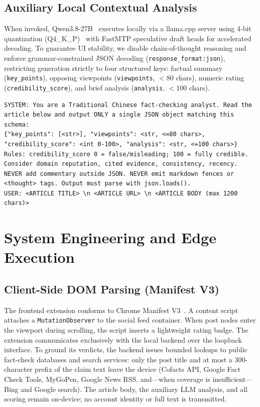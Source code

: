 \documentclass[twoside]{llncs}
\begin{document}
\subsection{Auxiliary Local Contextual Analysis}
When invoked, Qwen3.8-27B~\cite{qwen2025report} executes locally via a llama.cpp server using 4-bit quantization (Q4\_K\_P)~\cite{gguf2023} with FastMTP speculative draft heads for accelerated decoding. To guarantee UI stability, we disable chain-of-thought reasoning and enforce grammar-constrained JSON decoding (\texttt{response\_format:\allowbreak json}), restricting generation strictly to four structured keys: factual summary (\texttt{key\_points}), opposing viewpoints (\texttt{viewpoints}, $<80$ chars), numeric rating (\texttt{credibility\_score}), and brief analysis (\texttt{analysis}, $<100$ chars).

\begin{lstlisting}[basicstyle=\ttfamily\tiny,breaklines=true,
  columns=fullflexible,keepspaces=true,showstringspaces=false,
  frame=single,framesep=2pt,aboveskip=2pt,belowskip=2pt]
SYSTEM: You are a Traditional Chinese fact-checking analyst. Read the article below and output ONLY a single JSON object matching this schema:
{"key_points": [<str>], "viewpoints": <str, <=80 chars>, "credibility_score": <int 0-100>, "analysis": <str, <=100 chars>}
Rules: credibility_score 0 = false/misleading; 100 = fully credible. Consider domain reputation, cited evidence, consistency, recency. NEVER add commentary outside JSON. NEVER emit markdown fences or <thought> tags. Output must parse with json.loads().
USER: <ARTICLE TITLE> \n <ARTICLE URL> \n <ARTICLE BODY (max 1200 chars)>
\end{lstlisting}

\section{System Engineering and Edge Execution}

\subsection{Client-Side DOM Parsing (Manifest V3)}
The frontend extension conforms to Chrome Manifest V3~\cite{chrome_mv3}. A content script attaches a \texttt{MutationObserver} to the social feed container. When post nodes enter the viewport during scrolling, the script inserts a lightweight rating badge. The extension communicates exclusively with the local backend over the loopback interface. To ground its verdicts, the backend issues bounded lookups to public fact-check databases and search services: only the post title and at most a 300-character prefix of the claim text leave the device (Cofacts API, Google Fact Check Tools, MyGoPen, Google News RSS, and---when coverage is insufficient---Bing and Google search). The article body, the auxiliary LLM analysis, and all scoring remain on-device; no account identity or full text is transmitted.
\end{document}

